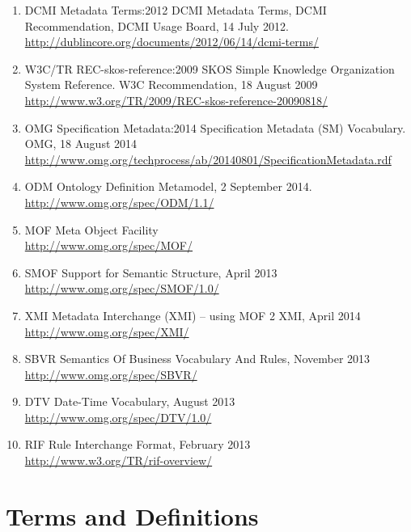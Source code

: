 \documentclass[10pt,fleqn,final]{scrreprt}
\newcommand{\clause}[1]{\chapter{#1}}
\begin{document}
\begin{enumerate}[label=\bfseries NR\arabic*:]
  \item{DCMI Metadata Terms:2012} {DCMI Metadata Terms, DCMI Recommendation, DCMI Usage Board, 14 July 2012.\\
     \url{http://dublincore.org/documents/2012/06/14/dcmi-terms/}}
  \item{W3C/TR REC-skos-reference:2009} {SKOS Simple Knowledge Organization System
Reference.  W3C Recommendation, 18 August 2009\\ \url{http://www.w3.org/TR/2009/REC-skos-reference-20090818/}}
  \item{OMG Specification Metadata:2014} {Specification Metadata (SM) Vocabulary.  OMG, 18 August 2014\\
\url{http://www.omg.org/techprocess/ab/20140801/SpecificationMetadata.rdf}}



  \item{ODM} {Ontology Definition Metamodel, 2 September 2014. \\ \url{http://www.omg.org/spec/ODM/1.1/}}
\item{MOF} { Meta Object Facility} \\ \url{http://www.omg.org/spec/MOF/}
\item{SMOF} { Support for Semantic Structure, April 2013} \\ \url{http://www.omg.org/spec/SMOF/1.0/}
\item{XMI} {Metadata Interchange (XMI) – using MOF 2 XMI, April 2014} \\ \url{http://www.omg.org/spec/XMI/}
\item{SBVR} {Semantics Of Business Vocabulary And Rules, November 2013} \\ \url{http://www.omg.org/spec/SBVR/}
\item{DTV} {Date-Time Vocabulary, August 2013} \\ \url{http://www.omg.org/spec/DTV/1.0/}
\item{RIF} {Rule Interchange Format, February 2013} \\ \url{http://www.w3.org/TR/rif-overview/}
\end{enumerate}




\clause{Terms and Definitions}\label{terms-and-defs}
\end{document}
